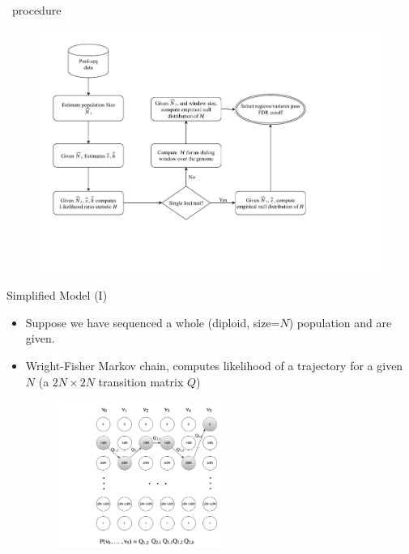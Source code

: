 \documentclass[t]{beamer} %
\begin{document}
\begin{frame}{\comale\ procedure}
	\begin{figure}
		\centering
		\includegraphics[trim={0.0in 0.0in .9in 
			0in},clip,width=\textwidth]{../figures/flowchart}
	\end{figure}
\end{frame}




\begin{frame}{ Simplified Model (I)}
	\begin{itemize}
		\item  Suppose we have sequenced a whole (diploid, size=$N$) 
		population   and  are given.
	\pause
		\item Wright-Fisher Markov chain, 
		computes likelihood of a trajectory for a given $N$  (a $2N  \times 
		2N $ transition matrix $Q$)
		\begin{figure}
			\includegraphics[trim={.05in 0in 0.0in 
				0.5in},clip,width=0.5\textwidth]{../figures/markoveg.png}
		\end{figure}
	\end{itemize}
\end{frame}
\end{document}
